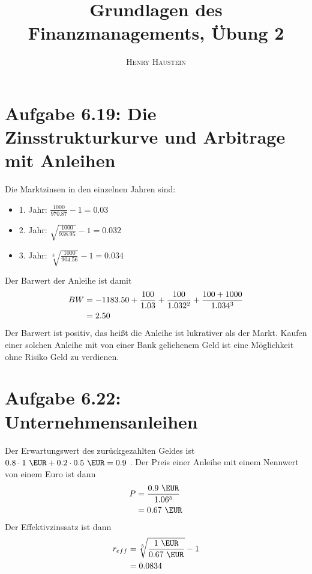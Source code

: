 \documentclass{article}
\title{\textbf{Grundlagen des Finanzmanagements, Übung 2}}
\author{\textsc{Henry Haustein}}
\date{}
\begin{document}
	\maketitle
	
	\section*{Aufgabe 6.19: Die Zinsstrukturkurve und Arbitrage mit Anleihen}
	Die Marktzinsen in den einzelnen Jahren sind:
	\begin{itemize}
		\item 1. Jahr: $\frac{1000}{970.87} -1 = 0.03$
		\item 2. Jahr: $\sqrt{\frac{1000}{938.95}} -1 = 0.032$
		\item 3. Jahr: $\sqrt[3]{\frac{1000}{904.56}} - 1 = 0.034$
	\end{itemize}
	Der Barwert der Anleihe ist damit
	\begin{align}
		BW &= -1183.50 + \frac{100}{1.03} + \frac{100}{1.032^2} + \frac{100 + 1000}{1.034^3} \notag \\
		&= 2.50 \notag
	\end{align}
	Der Barwert ist positiv, das heißt die Anleihe ist lukrativer als der Markt. Kaufen einer solchen Anleihe mit von einer Bank geliehenem Geld ist eine Möglichkeit ohne Risiko Geld zu verdienen.

	\section*{Aufgabe 6.22: Unternehmensanleihen}
	Der Erwartungswert des zurückgezahlten Geldes ist $0.8\cdot 1\text{ \EUR} + 0.2\cdot 0.5 \text{ \EUR} = 0.9$ \EUR. Der Preis einer Anleihe mit einem Nennwert von einem Euro ist dann
	\begin{align}
		P &= \frac{0.9 \text{ \EUR}}{1.06^5} \notag \\
		&= 0.67 \text{ \EUR} \notag
	\end{align}
	Der Effektivzinssatz ist dann
	\begin{align}
		r_{eff} &= \sqrt[5]{\frac{1\text{ \EUR}}{0.67\text{ \EUR}}} - 1 \notag \\
		&= 0.0834 \notag
	\end{align}
\end{document}
